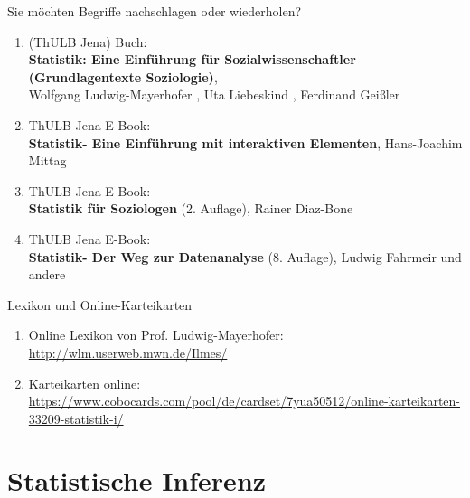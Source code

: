 \documentclass[usenames,dvipsnames,handout]{beamer}
\begin{document}
\begin{frame}{Sie möchten Begriffe  nachschlagen
oder wiederholen?}
\begin{enumerate}
\item{(ThULB Jena) Buch:\\ \textbf{Statistik: Eine Einführung für Sozialwissenschaftler (Grundlagentexte Soziologie)},\\
 Wolfgang Ludwig-Mayerhofer , Uta Liebeskind , Ferdinand Geißler }\pause
 \item{ThULB Jena E-Book: \\
 \textbf{Statistik-
 Eine Einführung mit interaktiven Elementen}, Hans-Joachim Mittag}\\ \pause
  \item{ThULB Jena E-Book: \\
   \textbf{Statistik für Soziologen} (2. Auflage), Rainer Diaz-Bone}\pause
   \item{ThULB Jena E-Book: \\
   \textbf{Statistik- Der Weg zur Datenanalyse} (8. Auflage), Ludwig Fahrmeir und andere}
\end{enumerate}
\end{frame}

\begin{frame}{Lexikon und Online-Karteikarten}
\begin{enumerate}
\item{Online Lexikon von Prof. Ludwig-Mayerhofer: \url{http://wlm.userweb.mwn.de/Ilmes/}}\pause
\item{Karteikarten online: \url{https://www.cobocards.com/pool/de/cardset/7yua50512/online-karteikarten-33209-statistik-i/}}
\end{enumerate}
\end{frame}
\section{Statistische Inferenz}
\end{document}
